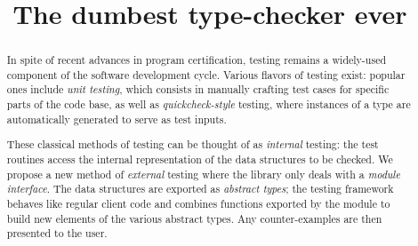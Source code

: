 \documentclass[nonatbib]{sigplanconf}
\begin{document}
\setlength{\pdfpageheight}{\paperheight}
\setlength{\pdfpagewidth}{\paperwidth}

\exclusivelicense


\title{The dumbest type-checker ever}


\maketitle

\begin{abstract}
  In spite of recent advances in program certification, testing remains a
  widely-used component of the software development cycle. Various flavors of
  testing exist: popular ones include \emph{unit testing}, which consists in
  manually crafting test cases for specific parts of the code base, as well as
  \emph{quickcheck-style} testing, where instances of a type are automatically
  generated to serve as test inputs.

  These classical methods of testing can be thought of as \emph{internal}
  testing: the test routines access the internal representation of the data
  structures to be checked. We propose a new method of \emph{external}
  testing where the library only deals with a \emph{module interface}. The data
  structures are exported as \emph{abstract types}; the testing framework
  behaves like regular client code and combines functions exported by the
  module to build new elements of the various abstract types. Any counter-examples
  are then presented to the user.
\end{abstract}



% 
% 
% 
% 
% 
% 
% 



\end{document}
